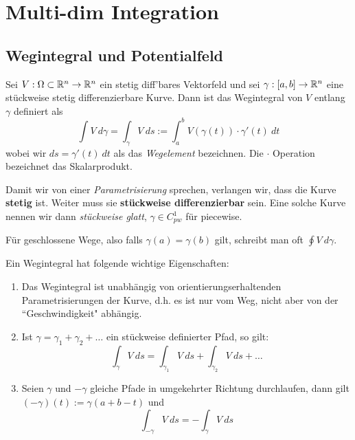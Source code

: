 \chapter{Multi-dim Integration}

\section{Wegintegral und Potentialfeld}

\begin{definition}
    Sei $V: \Omega \subset \mathbb{R}^n \to \mathbb{R}^n$ ein stetig diff'bares Vektorfeld und sei $\gamma: [a, b] \to \mathbb{R}^n$ eine stückweise stetig differenzierbare Kurve. Dann ist das Wegintegral von $V$ entlang $\gamma$ definiert als
    $$ \int V \: d\gamma = \int_\gamma V \: ds := \int_a^b V(\gamma(t)) \cdot \gamma'(t) \: dt$$
    wobei wir $ds = \gamma'(t) \: dt$ als das \textit{Wegelement} bezeichnen. Die $\cdot$ Operation bezeichnet das Skalarprodukt.
\end{definition}

\begin{remark}
    Damit wir von einer \textit{Parametrisierung} sprechen, verlangen wir, dass die Kurve \textbf{stetig} ist. Weiter muss sie \textbf{stückweise differenzierbar} sein. Eine solche Kurve nennen wir dann \textit{stückweise glatt}, $\gamma \in C^1_{pw}$ für piecewise.
\end{remark}

\begin{remark}
    Für geschlossene Wege, also falls $\gamma(a) = \gamma(b)$ gilt, schreibt man oft $\displaystyle  \oint V \: d\gamma.$
\end{remark}

\begin{theorem}[Wegintegral]
    Ein Wegintegral hat folgende wichtige Eigenschaften:
    \begin{enumerate}
    \item Das Wegintegral ist unabhängig von orientierungserhaltenden Parametrisierungen der Kurve, d.h. es ist nur vom Weg, nicht aber von der ``Geschwindigkeit" abhängig.
    \item Ist $\gamma = \gamma_1 + \gamma_2+ \dots$ ein stückweise definierter Pfad, so gilt: 
    $$ \int_{\gamma} V \: ds = \int_{\gamma_1} V \: ds + \int_{\gamma_2} V\: ds + \dots$$
    \item Seien $\gamma$ und $-\gamma$ gleiche Pfade in umgekehrter Richtung durchlaufen, dann gilt $(-\gamma)(t):= \gamma(a+b-t)$ und
    $$ \int_{-\gamma} V\: ds = - \int_{\gamma} V \: ds$$
    \end{enumerate}
\end{theorem}

